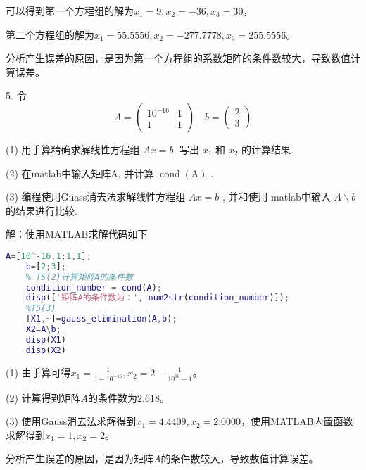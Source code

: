 \documentclass{ctexart}
\begin{document}
可以得到第一个方程组的解为$x_1=9,x_2=-36,x_3=30$，

第二个方程组的解为$x_1=55.5556,x_2=-277.7778,x_3=255.5556$。

分析产生误差的原因，是因为第一个方程组的系数矩阵的条件数较大，导致数值计算误差。

5. {\kaishu 令}
\[
A=\left(\begin{array}{cc}
10^{-16} & 1 \\
1 & 1
\end{array}\right) \quad b=\left(\begin{array}{l}
2 \\
3
\end{array}\right)
\]

{\kaishu 
(1) 用手算精确求解线性方程组 $ A x=b $, 写出 $ x_{1} $ 和 $x_{2}$ 的计算结果.

(2) 在matlab中输入矩阵A, 并计算  $\operatorname{cond}(\mathrm{A})$ .

(3) 编程使用Guass消去法求解线性方程组  $A x=b$ , 并和使用 matlab中输入  $A \backslash b$  的结果进行比较.}

解：使用MATLAB求解代码如下
\begin{lstlisting}[language=matlab]
    A=[10^-16,1;1,1];
    b=[2;3];
    % T5(2)计算矩阵A的条件数
    condition_number = cond(A);
    disp(['矩阵A的条件数为：', num2str(condition_number)]);
    %T5(3)
    [X1,~]=gauss_elimination(A,b);
    X2=A\b;
    disp(X1)
    disp(X2)
\end{lstlisting}

(1) 由手算可得$x_1=\frac{1}{1-10^{-16}},x_2=2-\frac{1}{10^{16}-1}$。

(2) 计算得到矩阵$A$的条件数为$2.618$。

(3) 使用Gauss消去法求解得到$x_1=4.4409,x_2=2.0000$，使用MATLAB内置函数求解得到$x_1=1,x_2=2$。

分析产生误差的原因，是因为矩阵$A$的条件数较大，导致数值计算误差。
\end{document}
